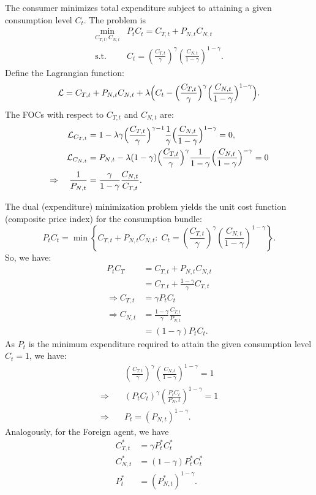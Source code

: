 \documentclass[a4paper,12pt]{article} %
\theoremstyle{nonitalic}
\begin{document}
The consumer minimizes total expenditure subject to attaining a given consumption level $C_t$. The problem is
\begin{align*}
    \min_{C_{T,t}, C_{N,t}} & P_t C_t = C_{T,t} + P_{N,t} C_{N,t} \\
    \text{s.t.} \quad &C_t = \left(\frac{C_{T,t}}{\gamma } \right)^{\gamma} \left(\frac{C_{N,t}}{1 - \gamma} \right)^{ 1-\gamma}.
\end{align*}
Define the Lagrangian function:
\[
\mathcal{L} = C_{T,t} + P_{N,t} C_{N,t} + \lambda \Bigl(C_t - \Bigl(\frac{C_{T,t}}{\gamma } \Bigr)^{\gamma} \Bigl(\frac{C_{N,t}}{1 - \gamma} \Bigr)^{ 1-\gamma}\Bigr).
\]
The FOCs with respect to $C_{T,t}$ and $C_{N,t}$ are:
\begin{align*}
    \mathcal{L}_{C_{T,t}} & = 1 - \lambda \gamma \Bigl(\frac{C_{T,t}}{\gamma } \Bigr)^{\gamma-1} \frac{1}{\gamma} \Bigl(\frac{C_{N,t}}{1 - \gamma} \Bigr)^{ 1-\gamma} = 0, \\
    \mathcal{L}_{C_{N,t}} & = P_{N,t} - \lambda (1-\gamma) \Bigl(\frac{C_{T,t}}{\gamma } \Bigr)^{\gamma} \frac{1}{1-\gamma} \Bigl(\frac{C_{N,t}}{1 - \gamma} \Bigr)^{ -\gamma} = 0 \\
    \Rightarrow \quad \frac{1}{P_{N,t}} & = \frac{\gamma}{1-\gamma} \frac{C_{N,t}}{C_{T,t}}.
\end{align*}

The dual (expenditure) minimization problem yields the unit cost function (composite price index) for the consumption bundle:
\[
P_t C_t = \min \left\{ C_{T,t} + P_{N,t} C_{N,t} : \; C_t = \left(\frac{C_{T,t}}{\gamma } \right)^{\gamma} \left(\frac{C_{N,t}}{1 - \gamma} \right)^{ 1-\gamma} \right\}.
\]
So, we have:
\begin{align*}
    P_t C_T & = C_{T,t} + P_{N,t} C_{N,t} \\
    &= C_{T,t} + \frac{1-\gamma}{\gamma} C_{T,t} \\
    \Rightarrow C_{T,t} &= \gamma P_t C_t \\
    \Rightarrow C_{N,t} &= \frac{1-\gamma}{\gamma} \frac{C_{T,t}}{P_{N,t}}\\
    &= (1-\gamma) P_t C_t.
\end{align*}
As $P_t$ is the minimum expenditure required to attain the given consumption level $C_t=1$, we have:
\begin{align*}
    & \left(\frac{C_{T,t}}{\gamma } \right)^{\gamma} \left(\frac{C_{N,t}}{1 - \gamma} \right)^{ 1-\gamma} = 1 \\
    \Rightarrow \quad & (P_t C_t)^{\gamma} \left(\frac{P_t C_t}{P_N,t}\right)^{1-\gamma} = 1 \\
    \Rightarrow \quad & P_t = (P_{N,t})^{1-\gamma}. 
\end{align*}
Analogously, for the Foreign agent, we have 
\begin{align*}
    C^*_{T,t} &= \gamma P^*_t C^*_t \\
    C^*_{N,t} &= (1-\gamma) P^*_t C^*_t \\
    P^*_t &= (P^*_{N,t})^{1-\gamma}.
\end{align*}
\end{document}
